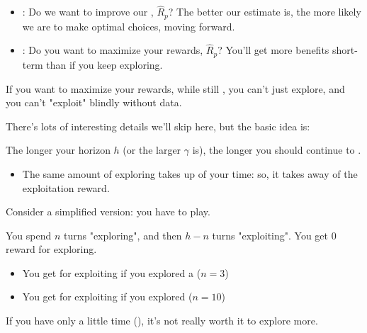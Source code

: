         \begin{itemize}
            \item {}: Do we want to improve our , $\widehat{R}_p$? The better our estimate is, the more likely we are to make optimal choices, moving forward.

            \item {}: Do you want to maximize your rewards,  $\widehat{R}_p$? You'll get more benefits short-term than if you keep exploring.
        \end{itemize}

        If you want to maximize your rewards, while still , you can't just explore, and you can't "exploit" blindly without data.

        There's lots of interesting details we'll skip here, but the basic idea is:\\

        \begin{concept}
            The longer your horizon $h$ (or the larger $\gamma$ is), the longer you should continue to .

            \begin{itemize}
                \item The same amount of exploring takes up  of your time: so, it takes away  of the exploitation reward.
            \end{itemize}
        \end{concept}


        \miniex Consider a simplified version: you have  to play.
        
        You spend $n$ turns "exploring", and then $h-n$ turns "exploiting". You get 0 reward for exploring.

        \begin{itemize}
            \item You get  for exploiting if you explored a  ($n=3$)

            \item You get  for exploiting if you explored  ($n=10$)
        \end{itemize}

        If you have only a little time (), it's not really worth it to explore more.

